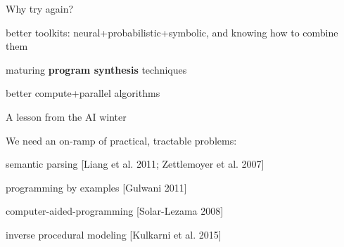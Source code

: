 \documentclass{beamer}
\begin{document}
\begin{frame}{Why try again?}

  better toolkits: neural+probabilistic+symbolic, and knowing how to combine them %

  \pause

  \phantom{better toolkits: }maturing \textbf{program synthesis} techniques

  \vspace{0.5cm}


  \pause

  better compute+parallel algorithms

  


\end{frame}
\begin{frame}{A lesson from the AI winter}

  We need an on-ramp of practical, tractable problems:

  \vspace{1cm}


  semantic parsing [Liang et al. 2011; Zettlemoyer et al. 2007]

  programming by examples [Gulwani 2011]

  computer-aided-programming [Solar-Lezama 2008]

  inverse procedural modeling [Kulkarni et al. 2015]
  


\end{frame}
\end{document}

